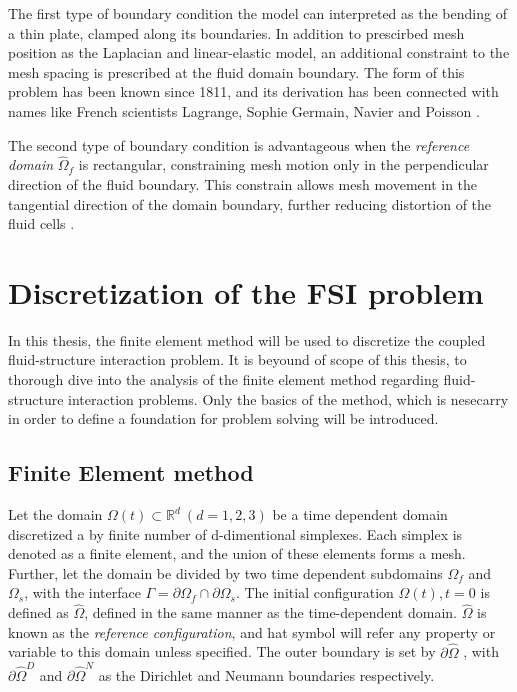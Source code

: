 The first type of boundary condition the model can interpreted as the bending of a thin plate, clamped along its boundaries. In addition to prescirbed mesh position as the  Laplacian and linear-elastic model, an additional constraint to the mesh spacing is prescribed at the fluid domain boundary. The form of this problem has been known since 1811, and its derivation has been connected with names like  French scientists Lagrange, Sophie Germain, Navier and Poisson \cite{Meleshko1997}.  

The second type of boundary condition is advantageous when the \textit{reference domain} $\hat{\Omega}_f$ is rectangular, constraining mesh motion only in the perpendicular direction of the fluid boundary. This constrain allows  mesh movement in the tangential direction of the domain boundary, further reducing distortion of the fluid cells  \cite{Wicka}.  

\newpage

\newpage
\section{Discretization of the FSI problem}
In this thesis, the finite element method will be used to discretize the coupled fluid-structure interaction problem. It is beyound of scope  of this thesis, to thorough dive into the analysis of the finite element method regarding fluid-structure interaction problems. Only the basics of the method, which is nesecarry in order to define a foundation for problem solving will be introduced. 

\subsection{Finite Element method}
Let the domain $\Omega(t) \subset \mathbb{R}^d \ (d = 1, 2, 3) $  be a time dependent domain discretized a by finite number of d-dimentional simplexes.  Each simplex is denoted as a finite element, and the union of these elements forms a mesh. Further, let the domain be divided by two time dependent subdomains $\Omega_f$ and $\Omega_s$, with the interface $\Gamma = \partial \Omega_f \cap \partial \Omega_s$. The initial configuration $\Omega(t), t = 0 $ is defined as $\hat{\Omega}$, defined in the same manner as the time-dependent domain. $\hat{\Omega}$ is  known as the \textit{reference configuration}, and hat symbol will refer any property or variable to this domain unless specified. The outer boundary is set by $\partial \hat{\Omega}$ , with $\partial \hat{\Omega}^D$ and $\partial \hat{\Omega}^N$ as the Dirichlet and Neumann boundaries respectively. \\ \\

